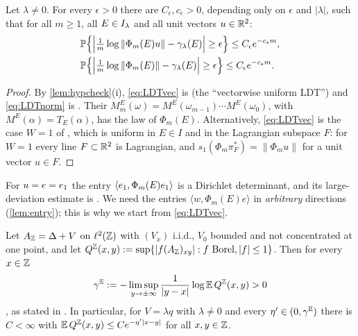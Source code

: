 \begin{proposition}\label{prop:LDT}
Let $\lambda\ne0$.  For every $\epsilon>0$ there are $C_\epsilon,c_\epsilon>0$, depending only on $\epsilon$
and $|\lambda|$, such that for all $m\ge1$, all $E\in I_\lambda$ and all unit vectors $u\in\mathbb{R}^2$:
\begin{align}
  &\mathbb{P}\Bigl\{\Bigl|\tfrac1m\log\|\Phi_m(E)u\|-\gamma_\lambda(E)\Bigr|\ge\epsilon\Bigr\}\le C_\epsilon e^{-c_\epsilon m},\label{eq:LDTvec}\\
  &\mathbb{P}\Bigl\{\Bigl|\tfrac1m\log\|\Phi_m(E)\|-\gamma_\lambda(E)\Bigr|\ge\epsilon\Bigr\}\le C_\epsilon e^{-c_\epsilon m}.\label{eq:LDTnorm}
\end{align}
\end{proposition}

\begin{proof}
By \cref{lem:hypcheck}(i), \eqref{eq:LDTvec} is \cite[Prop.~3.6]{Bucaj2019} (the ``vectorwise uniform
LDT'') and \eqref{eq:LDTnorm} is \cite[Thm.~3.1]{Bucaj2019}.  Their $M^E_m(\omega)=M^E(\omega_{m-1})\cdots M^E(\omega_0)$,
with $M^E(\alpha)=T_E(\alpha)$, has the law of $\Phi_m(E)$.  Alternatively, \eqref{eq:LDTvec} is the case
$W=1$ of \cite[Prop.~1.2]{MaceraSodin2022}, which is uniform in $E\in I$ and in the Lagrangian subspace
$F$: for $W=1$ every line $F\subset\mathbb{R}^2$ is Lagrangian, and $s_1(\Phi_m\pi_F^*)=\|\Phi_mu\|$ for a unit
vector $u\in F$.
\end{proof}

For $u=e=e_1$ the entry $\langle e_1,\Phi_m(E)e_1\rangle$ is a Dirichlet determinant, and its
large-deviation estimate is \cite[Lemma~2.3]{JZ2019}.  We need the entries $\langle w,\Phi_m(E)e\rangle$
in \emph{arbitrary} directions (\cref{lem:entry}); this is why we start from \eqref{eq:LDTvec}.

\begin{proposition}\label{prop:Zline}
Let $A_{\mathbb{Z}}=\Delta+V$ on $\ell^2(\mathbb{Z})$ with $(V_x)$ i.i.d., $V_0$ bounded and not concentrated at one point,
and let $Q^{\mathbb{Z}}(x,y):=\sup\{|f(A_{\mathbb{Z}})_{xy}|:f\text{ Borel},|f|\le1\}$.  Then for every $x\in\mathbb{Z}$
\begin{equation}\label{eq:GeZhao}
  \gamma^{\mathbb{E}}:=-\limsup_{y\to\pm\infty}\frac1{|y-x|}\log\mathbb{E}\,Q^{\mathbb{Z}}(x,y)>0
\end{equation}
\cite{GeZhao2020}, as stated in \cite[Thm.~1.1]{Macera2023}.  In particular, for $V=\lambda q$ with
$\lambda\ne0$ and every $\eta'\in(0,\gamma^{\mathbb{E}})$ there is $C<\infty$ with
$\mathbb{E}\,Q^{\mathbb{Z}}(x,y)\le Ce^{-\eta'|x-y|}$ for all $x,y\in\mathbb{Z}$.
\end{proposition}


